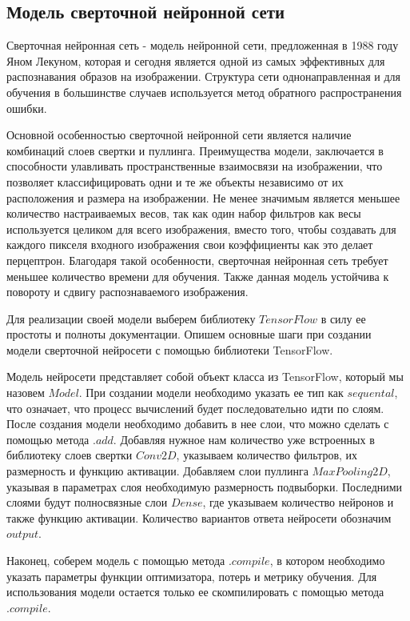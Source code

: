 \documentclass[12pt, a4paper]{article}
\begin{document}
\subsection{Модель сверточной нейронной сети}

Сверточная нейронная сеть - модель нейронной сети, предложенная в 1988 году Яном Лекуном, которая и сегодня является одной из самых эффективных для распознавания образов на изображении. Структура сети однонаправленная и для обучения в большинстве случаев используется метод обратного распространения ошибки. \cite{2}

Основной особенностью сверточной нейронной сети является наличие комбинаций слоев свертки и пуллинга. Преимущества модели, заключается в способности улавливать пространственные взаимосвязи на изображении, что позволяет классифицировать одни и те же объекты независимо от их расположения и размера на изображении. Не менее значимым является меньшее количество настраиваемых весов, так как один набор фильтров как весы используется целиком для всего изображения, вместо того, чтобы создавать для каждого пикселя входного изображения свои коэффициенты как это делает перцептрон. Благодаря такой особенности, сверточная нейронная сеть требует меньшее количество времени для обучения. Также данная модель устойчива к повороту и сдвигу распознаваемого изображения. 

Для реализации своей модели выберем библиотеку $TensorFlow$ в силу ее простоты и полноты документации. Опишем основные шаги при создании модели сверточной нейросети с помощью библиотеки TensorFlow. 

 Модель нейросети представляет собой объект класса из TensorFlow, который мы назовем $Model$. При создании модели необходимо указать ее тип как $sequental$, что означает, что процесс вычислений будет последовательно идти по слоям. После создания модели необходимо добавить в нее слои, что можно сделать с помощью метода $.add$. Добавляя нужное нам количество уже встроенных в библиотеку слоев свертки $Conv2D$, указываем количество фильтров, их размерность и функцию активации. Добавляем слои пуллинга $MaxPooling2D$, указывая в параметрах слоя необходимую размерность подвыборки. Последними слоями будут полносвязные слои $Dense$, где указываем количество нейронов и также функцию активации. Количество вариантов ответа нейросети обозначим $output$.
 
  Наконец, соберем модель с помощью метода $.compile$, в котором необходимо указать параметры функции оптимизатора, потерь и метрику обучения.  Для использования модели остается только ее скомпилировать с помощью метода $.compile$. 
 
\end{document}
